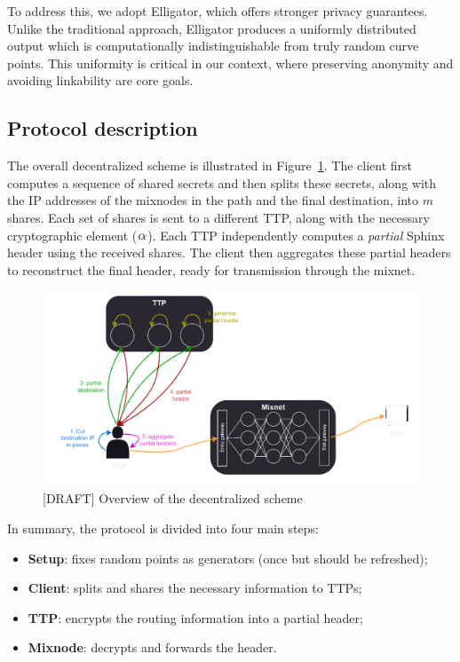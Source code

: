 To address this, we adopt Elligator, which offers stronger privacy guarantees. 
Unlike the traditional approach, Elligator produces a uniformly distributed output which is computationally indistinguishable from truly random curve points. 
This uniformity is critical in our context, where preserving anonymity and avoiding linkability are core goals. 

\subsection{Protocol description}

The overall decentralized scheme is illustrated in Figure~\ref{fig:overall_schema}.  
The client first computes a sequence of shared secrets and then splits these secrets, along with the IP addresses of the mixnodes in the path and the final destination, into $m$ shares.  
Each set of shares is sent to a different TTP, along with the necessary cryptographic element ($\ALPHA$).  
Each TTP independently computes a \textit{partial} Sphinx header using the received shares.  
The client then aggregates these partial headers to reconstruct the final header, ready for transmission through the mixnet.

\begin{figure}[H]
    \centering
    \includegraphics[width=0.8\linewidth]{Images/sphinx_ttp.png}
    \caption{[DRAFT] Overview of the decentralized scheme}
    \label{fig:overall_schema}
\end{figure}

\noindent In summary, the protocol is divided into four main steps:
\begin{itemize}
    \item \textbf{Setup}: fixes random points as generators (once but should be refreshed);
    \item \textbf{Client}: splits and shares the necessary information to TTPs;
    \item \textbf{TTP}: encrypts the routing information into a partial header;
    \item \textbf{Mixnode}: decrypts and forwards the header.
\end{itemize}


